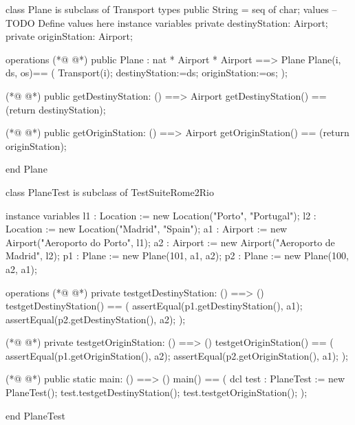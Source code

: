 \begin{vdmpp}[breaklines=true]
class Plane is subclass of Transport
types
public String = seq of char;
values
-- TODO Define values here
instance variables
private destinyStation: Airport;
private originStation: Airport;

operations
(*@
\label{Plane:11}
@*)
public Plane : nat * Airport * Airport ==> Plane
Plane(i, ds, os)== (
 Transport(i);
 destinyStation:=ds;
 originStation:=os;
 );
 
(*@
\label{getDestinyStation:18}
@*)
public getDestinyStation: () ==> Airport
 getDestinyStation() == (return destinyStation);
 
(*@
\label{getOriginStation:21}
@*)
public getOriginStation: () ==> Airport
 getOriginStation() == (return originStation);
  
end Plane

class PlaneTest is subclass of TestSuiteRome2Rio

 instance variables
 l1 :  Location := new Location("Porto", "Portugal");
 l2 : Location := new Location("Madrid", "Spain");
 a1 : Airport := new Airport("Aeroporto do Porto", l1);
 a2 : Airport := new Airport("Aeroporto de Madrid", l2);
 p1 : Plane := new Plane(101, a1, a2);
 p2 : Plane := new Plane(100, a2, a1);
 
 operations
(*@
\label{testgetDestinyStation:37}
@*)
  private testgetDestinyStation: () ==> ()
   testgetDestinyStation() == (
    assertEqual(p1.getDestinyStation(), a1);
    assertEqual(p2.getDestinyStation(), a2);
   );
   
(*@
\label{testgetOriginStation:43}
@*)
   private testgetOriginStation: () ==> ()
   testgetOriginStation() == (
    assertEqual(p1.getOriginStation(), a2);
    assertEqual(p2.getOriginStation(), a1);
   );
   
   
(*@
\label{main:50}
@*)
 public static main: () ==> ()
      main() ==
      (
       dcl test : PlaneTest := new PlaneTest();
       test.testgetDestinyStation();
       test.testgetOriginStation();
       );
       
end PlaneTest
\end{vdmpp}
